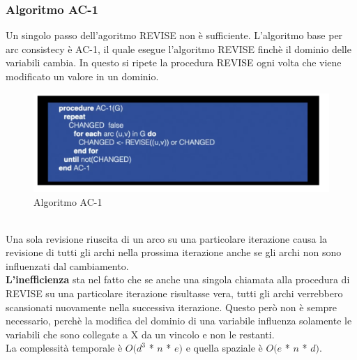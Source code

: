 \subsubsection{Algoritmo AC-1}
Un singolo passo dell’agoritmo REVISE non è sufficiente. L’algoritmo base per arc consistecy è AC-1, il quale esegue l’algoritmo REVISE finchè il dominio delle variabili cambia. In questo si ripete la procedura REVISE ogni volta che viene modificato un valore in un dominio.
\begin{figure}[htp]
	\centering
    \includegraphics[width=13cm, keepaspectratio]{img/Cap3/ac-1.png}
    \caption{Algoritmo AC-1}
\end{figure}
\\Una sola revisione riuscita di un arco su una particolare iterazione causa la revisione di tutti gli archi nella prossima iterazione anche se gli archi non sono influenzati dal cambiamento.
\\
\textbf{L’inefficienza} sta nel fatto che se anche una singola chiamata alla procedura di REVISE su una particolare iterazione risultasse vera, tutti gli archi verrebbero scansionati nuovamente nella successiva iterazione. Questo però non è sempre necessario, perchè la modifica del dominio di una variabile influenza solamente le variabili che sono collegate a X da un vincolo e non le restanti.
\\La complessità temporale è $O(d^3$ * $n$ * $e)$ e quella spaziale è $O(e$ * $n$ * $d)$.
\newpage
